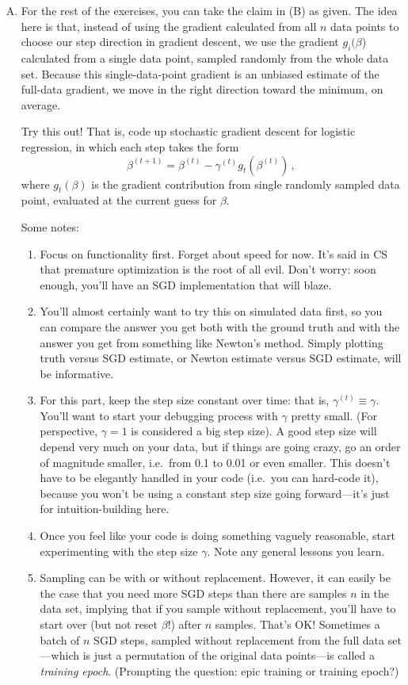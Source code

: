 \documentclass{article}
\begin{document}
\begin{enumerate}[(A)]
\item For the rest of the exercises, you can take the claim in (B) as given.  The idea here is that, instead of using the gradient calculated from all $n$ data points to choose our step direction in gradient descent, we use the gradient $g_i(\beta$) calculated from a single data point, sampled randomly from the whole data set.  Because this single-data-point gradient is an unbiased estimate of the full-data gradient, we move in the right direction toward the minimum, on average.

Try this out!  That is, code up stochastic gradient descent for logistic regression, in which each step takes the form
$$
\beta^{(t+1)} = \beta^{(t)} - \gamma^{(t)} g_t (\beta^{(t)}) \, ,
$$
where $g_t (\beta)$ is the gradient contribution from single randomly sampled data point, evaluated at the current guess for $\beta$.

Some notes:
\begin{enumerate}[1.]
\item Focus on functionality first.  Forget about speed for now.  It's said in CS that premature optimization is the root of all evil.  Don't worry: soon enough, you'll have an SGD implementation that will blaze.
\item You'll almost certainly want to try this on simulated data first, so you can compare the answer you get both with the ground truth and with the answer you get from something like Newton's method.  Simply plotting truth versus SGD estimate, or Newton estimate versus SGD estimate, will be informative.
\item For this part,  keep the step size constant over time: that is, $\gamma^{(t)} \equiv \gamma$.  You'll want to start your debugging process with $\gamma$ pretty small.  (For perspective, $\gamma = 1$ is considered a big step size).  A good step size will depend very much on your data, but if things are going crazy, go an order of magnitude smaller, i.e.~from 0.1 to 0.01 or even smaller.  This doesn't have to be elegantly handled in your code (i.e.~you can hard-code it), because you won't be using a constant step size going forward---it's just for intuition-building here.
\item Once you feel like your code is doing something vaguely reasonable, start experimenting with the step size $\gamma$.  Note any general lessons you learn.
\item Sampling can be with or without replacement.  However, it can easily be the case that you need more SGD steps than there are samples $n$ in the data set, implying that if you sample without replacement, you'll have to start over (but not reset $\beta$!) after $n$ samples.   That's OK!  Sometimes a batch of $n$ SGD steps, sampled without replacement from the full data set---which is just a permutation of the original data points---is called a \textit{training epoch}.  (Prompting the question: epic training or training epoch?)
\end{enumerate}



\end{enumerate}
\end{document}
